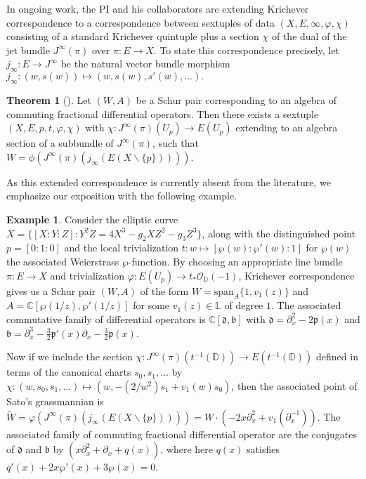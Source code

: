 \documentclass[11pt,letterpaper]{article}
\theoremstyle{definition}
\newtheorem{thm}{Theorem}
\newtheorem{ex}{Example}
\newcommand{\bbc}{\mathbb{C}}
\newcommand{\bbd}{\mathbb{D}}
\newcommand{\wt}{\widetilde}
\newcommand{\diff}{\backslash}
\begin{document}
In ongoing work, the PI and his collaborators are extending Krichever correspondence to a correspondence between sextuples of data $(X,E,\infty, \varphi,\chi)$ consisting of a standard Krichever quintuple plus a section $\chi$ of the dual of the jet bundle $J^\infty(\pi)$ over $\pi: E\rightarrow X$.
To state this correspondence precisely, let $j_\infty: E\rightarrow J^\infty$ be the natural vector bundle morphism $j_\infty: (w,s(w))\mapsto (w,s(w),s'(w),\dots).$
\begin{thm}[\cite{CHIY}]
Let $(W,A)$ be a Schur pair corresponding to an algebra of commuting fractional differential operators.
Then there exists a sextuple $(X,E,p,t,\varphi,\chi)$ with $\chi: J^\infty(\pi)(U_p)\rightarrow E(U_p)$ extending to an algebra section of a subbundle of $J^\infty(\pi)$, such that $W=\phi(J^\infty(\pi)(j_\infty(E(X\diff\{p\}))))$.
\end{thm}
As this extended correspondence is currently absent from the literature, we emphasize our exposition with the following example.
\begin{ex}
Consider the elliptic curve $X = \{[X:Y:Z]: Y^2Z=4X^3-g_2XZ^2-g_3Z^3\}$, along with the distinguished point $p=[0:1:0]$ and the local trivialization $t: w\mapsto [\wp(w):\wp'(w):1]$ for $\wp(w)$ the associated Weierstrass $\wp$-function.
By choosing an appropriate line bundle $\pi: E\rightarrow X$ and trivialization $\varphi: E(U_p)\rightarrow t_*\mathcal O_{\mathbb D}(-1)$, Krichever correspondence gives us a Schur pair $(W,A)$ of the form $W=\text{span}_A\{1,v_1(z)\}$ and $A=\bbc[\wp(1/z),\wp'(1/z)]$ for some $v_1(z)\in\mathbb L$ of degree $1$.
The associated commutative family of differential operators is $\bbc[\mathfrak d,\mathfrak b]$ with $\mathfrak d = \partial_x^2-2\mathfrak p(x)$ and $\mathfrak b = \partial_x^3-\frac{3}{2}\mathfrak p'(x)\partial_x-\frac{3}{2}\mathfrak p(x)$.

Now if we include the section $\chi: J^\infty(\pi)(t^{-1}(\bbd))\rightarrow E(t^{-1}(\bbd))$ defined in terms of the canonical charts $s_0,s_1,\dots$ by $\chi: (w,s_0,s_1,\dots)\mapsto (w,-(2/w^2)s_1 + v_1(w)s_0)$, then the associated point of Sato's grassmannian is $\wt W = \varphi(J^\infty(\pi)(j_\infty(E(X\diff\{p\})))) = W\cdot (-2x\partial_x^2 + v_1(\partial_x^{-1}))$.  The associated family of commuting fractional differential operator are the conjugates of $\mathfrak d$ and $\mathfrak b$ by $(x\partial_x^2+\partial_x + q(x))$, where here $q(x)$ satisfies $q'(x) + 2x\wp'(x) + 3\wp(x)=0$.
\end{ex}
\end{document}
